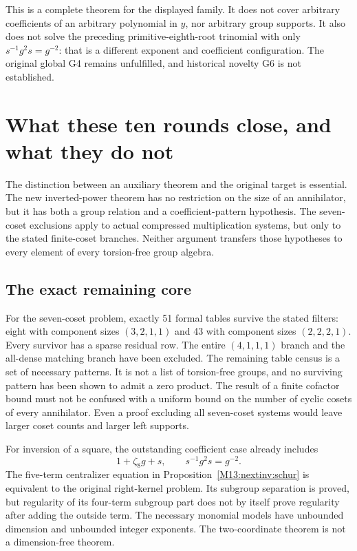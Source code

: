 \documentclass[11pt,a4paper,oneside]{report}
\theoremstyle{definition}
\theoremstyle{remark}
\begin{document}
This is a complete theorem for the displayed family. It does not
cover arbitrary coefficients of an arbitrary polynomial in $y$,
nor arbitrary group supports. It also does not solve the preceding
primitive-eighth-root trinomial with only
$s^{-1}g^2s=g^{-2}$: that is a different exponent and coefficient
configuration. The original global G4 remains unfulfilled, and
historical novelty G6 is not established.

\section{What these ten rounds close, and what they do not}
\label{M13:next:status}

The distinction between an auxiliary theorem and the original target
is essential. The new inverted-power theorem has no restriction on
the size of an annihilator, but it has both a group relation and a
coefficient-pattern hypothesis. The seven-coset exclusions apply to
actual compressed multiplication systems, but only to the stated
finite-coset branches. Neither argument transfers those hypotheses
to every element of every torsion-free group algebra.

\subsection{The exact remaining core}

For the seven-coset problem, exactly 51 formal tables survive the
stated filters: eight with component sizes $(3,2,1,1)$ and 43 with
component sizes $(2,2,2,1)$. Every survivor has a sparse residual
row. The entire $(4,1,1,1)$ branch and the all-dense matching branch
have been excluded. The remaining table census is a set of
necessary patterns. It is not a list of torsion-free groups, and
no surviving pattern has been shown to admit a zero product.
The result of a finite cofactor bound must not be confused with a
uniform bound on the number of cyclic cosets of every annihilator.
Even a proof excluding all seven-coset systems would leave larger
coset counts and larger left supports.

For inversion of a square, the outstanding coefficient case already
includes
\[
 1+\zeta_8g+s,\qquad s^{-1}g^2s=g^{-2}.
\]
The five-term centralizer equation in
Proposition~\ref{M13:nextinv:schur} is equivalent to the original
right-kernel problem. Its subgroup separation is proved, but
regularity of its four-term subgroup part does not by itself prove
regularity after adding the outside term. The necessary monomial
models have unbounded dimension and unbounded integer exponents.
The two-coordinate theorem is not a dimension-free theorem.
\end{document}
